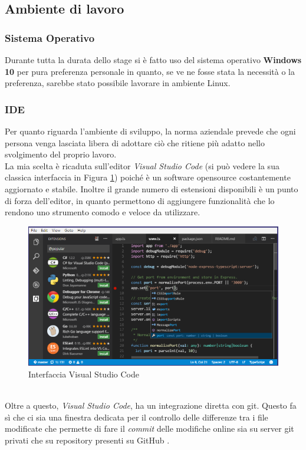 \subsection{Ambiente di lavoro}
\subsubsection{Sistema Operativo}
Durante tutta la durata dello stage si è fatto uso del sistema operativo \textbf{Windows 10} per pura preferenza personale in quanto, se ve ne fosse stata la necessità o la preferenza, sarebbe stato possibile lavorare in ambiente Linux.
\subsubsection{IDE}
Per quanto riguarda l'ambiente di sviluppo, la norma aziendale prevede che ogni persona venga lasciata libera di adottare ciò che ritiene più adatto nello svolgimento del proprio lavoro.\\
La mia scelta è ricaduta sull'editor \textit{Visual Studio Code} (si può vedere la sua classica interfaccia in Figura \ref{img:visualstudiocode}) poiché è un software \gls{opensource} costantemente aggiornato e stabile. Inoltre il grande numero di estensioni disponibili è un punto di forza dell'editor, in quanto permettono di aggiungere funzionalità che lo rendono uno strumento comodo e veloce da utilizzare.
\begin{figure}[h]
	\centering
	\includegraphics[scale=0.5]{immagini/vsc_interface}
	\caption{Interfaccia Visual Studio Code}
	\label{img:visualstudiocode}
\end{figure}
\\
Oltre a questo, \textit{Visual Studio Code}, ha un integrazione diretta con \gls{git}. Questo fa sì che ci sia una finestra dedicata per il controllo delle differenze tra i file modificate che permette di fare il \textit{commit} delle modifiche online sia su server \gls{git} privati che su \gls{repository} presenti su GitHub \cite{gitGuida, gitSite}.
